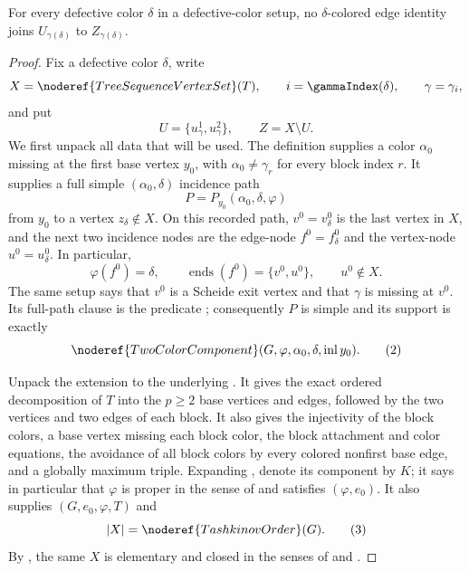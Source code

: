 \begin{lemma}
For every defective color $\delta$ in a defective-color setup, no
$\delta$-colored edge identity joins
$U_{\gamma(\delta)}$ to $Z_{\gamma(\delta)}$.
\end{lemma}
\begin{proof}
Fix a defective color $\delta$, write
\[
 X=\noderef{TreeSequenceVertexSet}(T),\qquad
 i=\gammaIndex(\delta),\qquad \gamma=\gamma_i,
\]
and put
\[
 U=\{u^1_\gamma,u^2_\gamma\},\qquad Z=X\setminus U.
\]
We first unpack all data that will be used.  The definition
 supplies a color $\alpha_0$ missing at the
first base vertex $y_0$, with $\alpha_0\ne\gamma_r$ for every block index
$r$.  It supplies a full simple $(\alpha_0,\delta)$ incidence path
\[
 P=P_{y_0}(\alpha_0,\delta,\varphi)
\]
from $y_0$ to a vertex $z_\delta\notin X$.  On this recorded path,
$v^0=v^0_\delta$ is the last vertex in $X$, and the next two incidence
nodes are the edge-node $f^0=f^0_\delta$ and the vertex-node
$u^0=u^0_\delta$.  In particular,
\[
 \varphi(f^0)=\delta,\qquad
 \operatorname{ends}(f^0)=\{v^0,u^0\},\qquad u^0\notin X.       \tag{1}
\]
The same setup says that $v^0$ is a Scheide exit vertex and that
$\gamma$ is missing at $v^0$.  Its full-path clause is the predicate
; consequently $P$ is simple and its
support is exactly
\[
 \noderef{TwoColorComponent}
   (G,\varphi,\alpha_0,\delta,\operatorname{inl}y_0).           \tag{2}
\]

Unpack the extension  to the
underlying .  It gives the exact
ordered decomposition of $T$ into the $p\geq2$ base vertices and edges,
followed by the two vertices and two edges of each block.  It also gives
the injectivity of the block colors, a base vertex missing each block
color, the block attachment and color equations, the avoidance of all
block colors by every colored nonfirst base edge, and a globally maximum
triple.  Expanding , denote its
 component by $K$; it says in particular that $\varphi$
is proper in the sense of  and satisfies
$(\varphi,e_0)$.  It also supplies
$(G,e_0,\varphi,T)$ and
\[
 |X|=\noderef{TashkinovOrder}(G).                               \tag{3}
\]
By , the same $X$ is elementary and
closed in the senses of  and
.


\end{proof}
